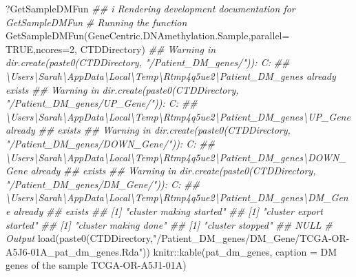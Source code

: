\documentclass[]{article}
\newcommand{\hlnum}[1]{\textcolor[rgb]{0.816,0.125,0.439}{#1}}%
\newcommand{\hlstr}[1]{\textcolor[rgb]{0.251,0.627,0.251}{#1}}%
\newcommand{\hlcom}[1]{\textcolor[rgb]{0.502,0.502,0.502}{\textit{#1}}}%
\newcommand{\hlstd}[1]{\textcolor[rgb]{0.251,0.251,0.251}{#1}}%
\newenvironment{Shaded}{\begin{myshaded}}{\end{myshaded}}
\newcommand{\DecValTok}[1]{\hlnum{#1}}
\newcommand{\ConstantTok}[1]{\hlnum{#1}}
\newcommand{\SpecialCharTok}[1]{\hlstr{#1}}
\newcommand{\StringTok}[1]{\hlstr{#1}}
\newcommand{\CommentTok}[1]{\hlcom{#1}}
\newcommand{\DocumentationTok}[1]{\hlcom{#1}}
\newcommand{\FunctionTok}[1]{\hlstd{#1}}
\newcommand{\AttributeTok}[1]{{#1}}
\newcommand{\NormalTok}[1]{\hlstd{#1}}
\begin{document}
\begin{Shaded}
\begin{Highlighting}[]
\NormalTok{?GetSampleDMFun}
\DocumentationTok{\#\# i Rendering development documentation for \textquotesingle{}GetSampleDMFun\textquotesingle{}}
\CommentTok{\# Running the function}
\FunctionTok{GetSampleDMFun}\NormalTok{(GeneCentric.DNAmethylation.Sample,}\AttributeTok{parallel=} \ConstantTok{TRUE}\NormalTok{,}\AttributeTok{ncores=}\DecValTok{2}\NormalTok{, CTDDirectory)}
\DocumentationTok{\#\# Warning in dir.create(paste0(CTDDirectory, "/Patient\_DM\_genes/")): \textquotesingle{}C:}
\DocumentationTok{\#\# \textbackslash{}Users\textbackslash{}Sarah\textbackslash{}AppData\textbackslash{}Local\textbackslash{}Temp\textbackslash{}Rtmp4q5ue2\textbackslash{}Patient\_DM\_genes\textquotesingle{} already exists}
\DocumentationTok{\#\# Warning in dir.create(paste0(CTDDirectory, "/Patient\_DM\_genes/UP\_Gene/")): \textquotesingle{}C:}
\DocumentationTok{\#\# \textbackslash{}Users\textbackslash{}Sarah\textbackslash{}AppData\textbackslash{}Local\textbackslash{}Temp\textbackslash{}Rtmp4q5ue2\textbackslash{}Patient\_DM\_genes\textbackslash{}UP\_Gene\textquotesingle{} already}
\DocumentationTok{\#\# exists}
\DocumentationTok{\#\# Warning in dir.create(paste0(CTDDirectory, "/Patient\_DM\_genes/DOWN\_Gene/")): \textquotesingle{}C:}
\DocumentationTok{\#\# \textbackslash{}Users\textbackslash{}Sarah\textbackslash{}AppData\textbackslash{}Local\textbackslash{}Temp\textbackslash{}Rtmp4q5ue2\textbackslash{}Patient\_DM\_genes\textbackslash{}DOWN\_Gene\textquotesingle{} already}
\DocumentationTok{\#\# exists}
\DocumentationTok{\#\# Warning in dir.create(paste0(CTDDirectory, "/Patient\_DM\_genes/DM\_Gene/")): \textquotesingle{}C:}
\DocumentationTok{\#\# \textbackslash{}Users\textbackslash{}Sarah\textbackslash{}AppData\textbackslash{}Local\textbackslash{}Temp\textbackslash{}Rtmp4q5ue2\textbackslash{}Patient\_DM\_genes\textbackslash{}DM\_Gene\textquotesingle{} already}
\DocumentationTok{\#\# exists}
\DocumentationTok{\#\# [1] "cluster making started"}
\DocumentationTok{\#\# [1] "cluster export started"}
\DocumentationTok{\#\# [1] "cluster making done"}
\DocumentationTok{\#\# [1] "cluster stopped"}
\DocumentationTok{\#\# NULL}
\CommentTok{\# Output}
\FunctionTok{load}\NormalTok{(}\FunctionTok{paste0}\NormalTok{(CTDDirectory,}\StringTok{"/Patient\_DM\_genes/DM\_Gene/TCGA{-}OR{-}A5J6{-}01A\_pat\_dm\_genes.Rda"}\NormalTok{))}
\NormalTok{knitr}\SpecialCharTok{::}\FunctionTok{kable}\NormalTok{(pat\_dm\_genes, }\AttributeTok{caption =} \StringTok{\textquotesingle{}DM genes of the sample TCGA{-}OR{-}A5J1{-}01A\textquotesingle{}}\NormalTok{)}
\end{Highlighting}
\end{Shaded}
\end{document}
